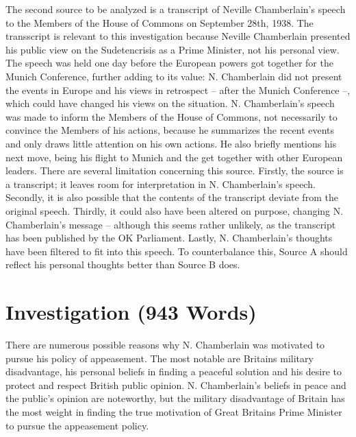 \documentclass[10pt, a4papert, hidelinks]{article}
\begin{document}
The second source to be analyzed is a transcript of Neville Chamberlain's speech to the Members of the House of Commons on September 28th, 1938.
The transscript is relevant to this investigation because Neville Chamberlain presented his public view on the Sudetencrisis as a Prime Minister, not his personal view.
The speech was held one day before the European powers got together for the Munich Conference, further adding to its value: N. Chamberlain did not present the events in Europe and his views in retrospect -- after the Munich Conference --, which could have changed his views on the situation.
N. Chamberlain's speech was made to inform the Members of the House of Commons, not necessarily to convince the Members of his actions, because he summarizes the recent events and only draws little attention on his own actions. He also briefly mentions his next move, being his flight to Munich and the get together with other European leaders.
There are several limitation concerning this source.
Firstly, the source is a transcript; it leaves room for interpretation in N. Chamberlain's speech. Secondly, it is also possible that the contents of the transcript deviate from the original speech. Thirdly, it could also have been altered on purpose, changing N. Chamberlain's message -- although this seems rather unlikely, as the transcript has been published by the OK Parliament. Lastly, N. Chamberlain's thoughts have been filtered to fit into this speech. To counterbalance this, Source A should reflect his personal thoughts better than Source B does.
\cite{prime_minister_statement_common_sittings_european_situation}

\section{Investigation (943 Words)} %


There are numerous possible reasons why N. Chamberlain was motivated to pursue his policy of appeasement. The most notable are Britains military disadvantage, his personal beliefs in finding a peaceful solution and his desire to protect and respect British public opinion. N. Chamberlain's beliefs in peace and the public's opinion are noteworthy, but the military disadvantage of Britain has the most weight in finding the true motivation of Great Britains Prime Minister to pursue the appeasement policy.
\end{document}
